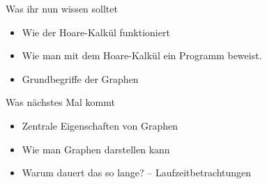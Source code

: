 



\begin{frame}	
	\begin{block}{Was ihr nun wissen solltet}
		\begin{itemize}
			\item Wie der Hoare-Kalkül funktioniert %
			\item Wie man mit dem Hoare-Kalkül ein Programm beweist.
			\item Grundbegriffe der Graphen
		\end{itemize}
	\end{block}
	
	\begin{block}{Was nächstes Mal kommt}
		\begin{itemize}
			\item Zentrale Eigenschaften von Graphen
			\item Wie man Graphen darstellen kann
			\item Warum dauert das so lange? -- Laufzeitbetrachtungen
		\end{itemize}
	\end{block}
\end{frame}

\slideThanks

